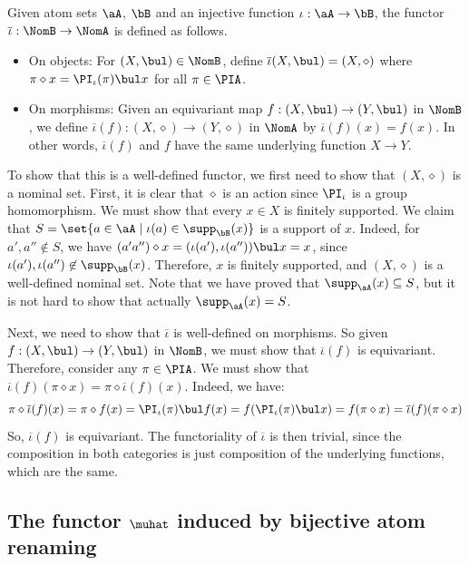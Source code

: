\documentclass[twoside,11pt]{entics}
\begin{document}
\begin{xdefinition}
  Given atom sets $\aA$, $\bB$ and an injective function
  $\iota:\aA\to\bB$, the functor $\overline{\iota}:\NomB\to\NomA$ is defined
  as follows.

\begin{itemize}
\item{} On objects: For $(X,\bul)\in\NomB$, define
  $\overline{\iota}(X,\bul)=(X,\diamond)$ where $\pi\diamond x=
  \PI_\iota(\pi)\bul x$ for all $\pi\in \PIA$.
\item{} On morphisms: Given an equivariant map $f:(X,\bul) \to
  (Y,\bul)$ in $\NomB$, we define $\overline{\iota}(f):(X,\diamond)\to
  (Y,\diamond)$ in $\NomA$ by $\overline{\iota}(f)(x)=f(x)$. In other
  words, $\overline{\iota}(f)$ and $f$ have the same underlying function
  $X\to Y$.
\end{itemize}

To show that this is a well-defined functor, we first need to show
that $(X,\diamond)$ is a nominal set. First, it is clear that
$\diamond$ is an action since $\PI_{\iota}$ is a group homomorphism. We
must show that every $x\in X$ is finitely supported. We claim that
$S=\set{a\in \aA \mid \iota(a)\in \supp_{\bB}(x)}$ is a support of $x$.
Indeed, for $a',a''\not\in S$, we have $(a'a'')\diamond x =
(\iota(a'),\iota(a''))\bul x =x$, since $\iota(a'),\iota(a'')\not\in \supp_\bB(x)$.
Therefore, $x$ is finitely supported, and $(X,\diamond)$ is a
well-defined nominal set.  Note that we have proved that
$\supp_{\aA}(x)\subseteq S$, but it is not hard to show that actually
$\supp_{\aA}(x)=S$.

Next, we need to show that $\overline{\iota}$ is well-defined on
morphisms. So given $f:(X,\bul) \to (Y,\bul)$ in $\NomB$, we
must show that $\overline{\iota}(f)$ is equivariant. Therefore, consider
any $\pi \in \PIA$. We must show that
$\overline{\iota}(f)(\pi\diamond x) = \pi \diamond \overline{\iota}(f)(x)$.
Indeed, we have:
\[
\pi \diamond \overline{\iota}(f)(x) = \pi \diamond f(x)
 =  \PI_\iota(\pi) \bul f(x)
 =  f(\PI_\iota(\pi) \bul x)
 =  f(\pi \diamond x)
 =  \overline{\iota} (f)(\pi \diamond x)
\]
So, $\overline{\iota}(f)$ is equivariant. The functoriality of
$\overline{\iota}$ is then trivial, since the composition in both
categories is just composition of the underlying functions, which are
the same.
\end{xdefinition}

\subsection{The functor \texorpdfstring{$\muhat$}{μ} induced by bijective atom renaming}
\label{ssec:muhat-bijective}
\end{document}

